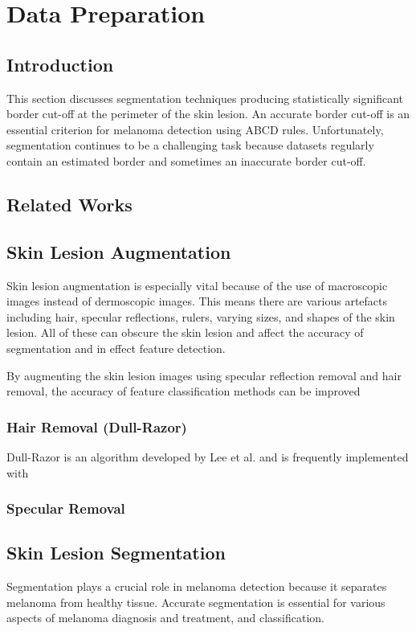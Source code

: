 \chapter{Data Preparation}

\section{Introduction}
This section discusses segmentation techniques producing statistically significant border cut-off at the perimeter of the skin lesion. An accurate border cut-off is an essential criterion for melanoma detection \cite{Pereira2020, Kaya2016} using ABCD rules. Unfortunately, segmentation continues to be a challenging task because datasets regularly contain an estimated border and sometimes an inaccurate border cut-off.

\section{Related Works}



\section{Skin Lesion Augmentation}
Skin lesion augmentation is especially vital because of the use of macroscopic images instead of dermoscopic images. This means there are various artefacts including hair, specular reflections, rulers, varying sizes, and shapes of the skin lesion. All of these can obscure the skin lesion and affect the accuracy of segmentation\cite{Unver2019} and in effect feature detection.

By augmenting the skin lesion images using specular reflection removal and hair removal, the accuracy of feature classification methods can be improved

\subsection{Hair Removal (Dull-Razor)}
Dull-Razor is an algorithm developed by Lee et al\cite{Lee1997}. and is frequently implemented with 

\subsection{Specular Removal}

\section{Skin Lesion Segmentation}
Segmentation plays a crucial role in melanoma detection because it separates melanoma from healthy tissue. Accurate segmentation is essential for various aspects of melanoma diagnosis and treatment, and classification\cite{Albahli2020}.

